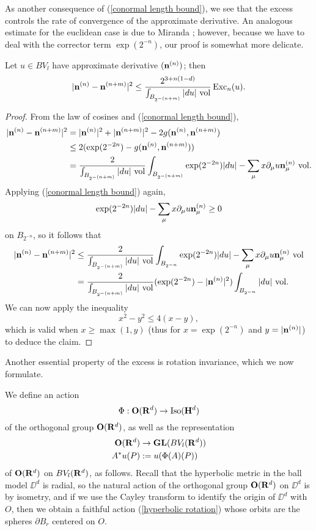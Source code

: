 As another consequence of (\ref{conormal length bound}), we see that the excess controls the rate of convergence of the approximate derivative. An analogous estimate for the euclidean case is due to Miranda \cite[pg661]{Miranda66}; however, because we have to deal with the corrector term $\exp(2^{-n})$, our proof is somewhat more delicate.

\begin{lemma}\label{excess bounds Cauchy sequence}
Let $u \in BV_l$ have approximate derivative $(\mathbf n^{(n)})$; then
$$|\mathbf n^{(n)} - \mathbf n^{(n + m)}|^2 \leq \frac{2^{3 + n(1 - d)}}{\int_{B_{2^{-(n + m)}}} |du| ~\mathrm{vol}} \operatorname{Exc}_n(u).$$
\end{lemma}
\begin{proof}
From the law of cosines and (\ref{conormal length bound}),
\begin{align*}
|\mathbf n^{(n)} - \mathbf n^{(n + m)}|^2 &= |\mathbf n^{(n)}|^2 + |\mathbf n^{(n + m)}|^2 - 2 g(\mathbf n^{(n)}, \mathbf n^{(n + m)})\\
&\leq 2(\exp(2^{-2n}) - g(\mathbf n^{(n)}, \mathbf n^{(n + m)})) \\
&= \frac{2}{\int_{B_{2^{-(n + m)}}} |du| ~\mathrm{vol}} \int_{B_{2^{-(n + m)}}} \exp(2^{-2n}) |du| - \sum_\mu x \partial_\mu u \mathbf n_\mu^{(n)} ~\mathrm{vol}.
\end{align*}
Applying (\ref{conormal length bound}) again,
$$\exp(2^{-2n}) |du| - \sum_\mu x \partial_\mu u \mathbf n_\mu^{(n)} \geq 0$$
on $B_{2^{-n}}$, so it follows that
\begin{align*}
|\mathbf n^{(n)} - \mathbf n^{(n + m)}|^2 &\leq \frac{2}{\int_{B_{2^{-(n + m)}}} |du| ~\mathrm{vol}} \int_{B_{2^{-n }}} \exp(2^{-2n}) |du| - \sum_\mu x \partial_\mu u \mathbf n_\mu^{(n)} ~\mathrm{vol}\\
&= \frac{2}{\int_{B_{2^{-(n + m)}}} |du| ~\mathrm{vol}} (\exp(2^{-2n}) - |\mathbf n^{(n)}|^2) \int_{B_{2^{-n}}} |du| ~\mathrm{vol}.
\end{align*}
We can now apply the inequality
$$x^2 - y^2 \leq 4(x - y),$$
which is valid when $x \geq \max(1, y)$ (thus for $x = \exp(2^{-n})$ and $y = |\mathbf n^{(n)}|$) to deduce the claim.
\end{proof}

Another essential property of the excess is rotation invariance, which we now formulate.

\begin{notation}
We define an action
\begin{equation}\label{hyperbolic rotation}
    \Phi: \mathbf{O}(\mathbf{R}^d) \to \operatorname{Iso}(\mathbf H^d)
\end{equation}
of the orthogonal group $\mathbf{O}(\mathbf{R}^d)$, as well as the representation
\begin{align*}
\mathbf{O}(\mathbf{R}^d) &\to \mathbf{GL}(BV_l(\mathbf{R}^d))\\
A^* u(P) &:= u(\Phi(A)(P))
\end{align*}
of $\mathbf{O}(\mathbf{R}^d)$ on $BV_l(\mathbf{R}^d)$, as follows.
Recall that the hyperbolic metric in the ball model $\DD^d$ is radial, so the natural action of the orthogonal group $\mathbf{O}(\mathbf{R}^d)$ on $\DD^d$ is by isometry, and if we use the Cayley transform to identify the origin of $\DD^d$ with $O$, then we obtain a faithful action (\ref{hyperbolic rotation}) whose orbits are the spheres $\partial B_r$ centered on $O$.
\end{notation}

